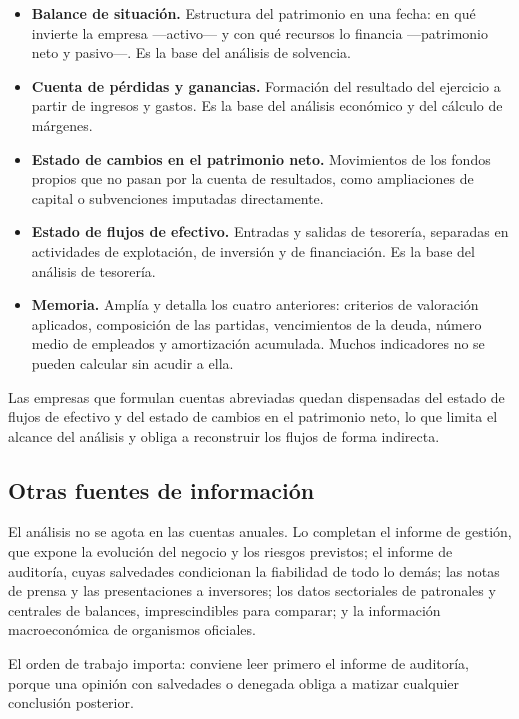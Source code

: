 \documentclass[12pt]{book} %
\providecommand{\tightlist}{%
  \setlength{\itemsep}{0pt}\setlength{\parskip}{0pt}}
\begin{document}
\begin{itemize}
\tightlist
\item
  \textbf{Balance de situación.} Estructura del patrimonio en una fecha:
  en qué invierte la empresa ---activo--- y con qué recursos lo financia
  ---patrimonio neto y pasivo---. Es la base del análisis de solvencia.
\item
  \textbf{Cuenta de pérdidas y ganancias.} Formación del resultado del
  ejercicio a partir de ingresos y gastos. Es la base del análisis
  económico y del cálculo de márgenes.
\item
  \textbf{Estado de cambios en el patrimonio neto.} Movimientos de los
  fondos propios que no pasan por la cuenta de resultados, como
  ampliaciones de capital o subvenciones imputadas directamente.
\item
  \textbf{Estado de flujos de efectivo.} Entradas y salidas de
  tesorería, separadas en actividades de explotación, de inversión y de
  financiación. Es la base del análisis de tesorería.
\item
  \textbf{Memoria.} Amplía y detalla los cuatro anteriores: criterios de
  valoración aplicados, composición de las partidas, vencimientos de la
  deuda, número medio de empleados y amortización acumulada. Muchos
  indicadores no se pueden calcular sin acudir a ella.
\end{itemize}

Las empresas que formulan cuentas abreviadas quedan dispensadas del
estado de flujos de efectivo y del estado de cambios en el patrimonio
neto, lo que limita el alcance del análisis y obliga a reconstruir los
flujos de forma indirecta.

\hypertarget{otras-fuentes-de-informaciuxf3n}{%
\subsection{Otras fuentes de
información}\label{otras-fuentes-de-informaciuxf3n}}

El análisis no se agota en las cuentas anuales. Lo completan el informe
de gestión, que expone la evolución del negocio y los riesgos previstos;
el informe de auditoría, cuyas salvedades condicionan la fiabilidad de
todo lo demás; las notas de prensa y las presentaciones a inversores;
los datos sectoriales de patronales y centrales de balances,
imprescindibles para comparar; y la información macroeconómica de
organismos oficiales.

El orden de trabajo importa: conviene leer primero el informe de
auditoría, porque una opinión con salvedades o denegada obliga a matizar
cualquier conclusión posterior.
\end{document}
